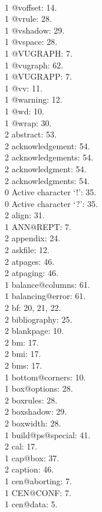 \\1 @voffset: 14.
\\1 @vrule: 28.
\\1 @vshadow: 29.
\\1 @vspace: 28.
\\1 @VUGRAPH: 7.
\\1 @vugraph: 62.
\\1 @VUGRAPP: 7.
\\1 @vv: 11.
\\1 @warning: 12.
\\1 @wd: 10.
\\1 @wrap: 30.
\\2 abstract: 53.
\\2 acknowledgement: 54.
\\2 acknowledgements: 54.
\\2 acknowledgment: 54.
\\2 acknowledgments: 54.
\\0 Active character `!': 35.
\\0 Active character `?': 35.
\\2 align: 31.
\\1 ANN@REPT: 7.
\\2 appendix: 24.
\\2 askfile: 12.
\\2 atpages: 46.
\\2 atpaging: 46.
\\1 balance@columns: 61.
\\1 balancing@error: 61.
\\2 bf: 20, 21, 22.
\\2 bibliography: 25.
\\2 blankpage: 10.
\\2 bm: 17.
\\2 bmi: 17.
\\2 bms: 17.
\\1 bottom@corners: 10.
\\1 box@options: 28.
\\2 boxrules: 28.
\\2 boxshadow: 29.
\\2 boxwidth: 28.
\\1 build@ps@special: 41.
\\2 cal: 17.
\\1 cap@box: 37.
\\2 caption: 46.
\\1 cen@aborting: 7.
\\1 CEN@CONF: 7.
\\1 cen@data: 5.
